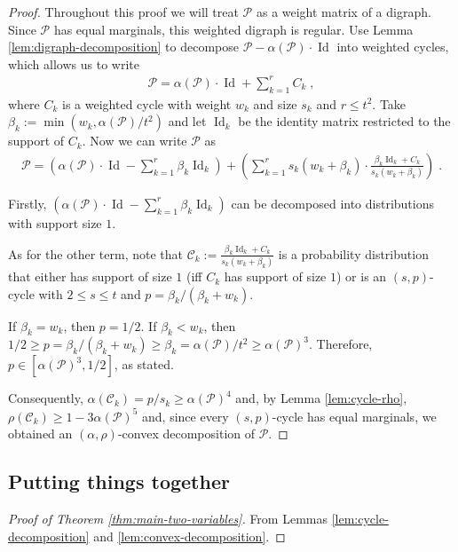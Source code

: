 \documentclass{daj}
\newcommand{\1}{\mathbbm{1}}
\theoremstyle{plain}
\theoremstyle{definition}
\DeclareMathOperator{\Id}{Id}
\newcommand{\cP}{\mathcal{P}}
\begin{document}
\begin{proof}
Throughout this proof we will treat $\mathcal{P}$ as a weight matrix of
a digraph. Since $\cP$ has equal marginals, this weighted digraph is regular.
Use Lemma \ref{lem:digraph-decomposition} to decompose
$\cP - \alpha(\cP) \cdot \Id$ into weighted cycles, which allows us to write
\begin{align*}
	\cP = \alpha(\cP) \cdot \Id + \sum_{k=1}^{r} C_k \; ,
\end{align*}
where $C_k$ is a weighted cycle with weight $w_k$ and size $s_k$
and $r \le t^2$.
Take $\beta_k := \min(w_k, \alpha(\cP) / t^2)$ and let
$\Id_k$ be the identity matrix restricted to the support of $C_k$. Now we
can write $\cP$ as
\begin{align*}
\cP = \left( \alpha(\cP) \cdot \Id - \sum_{k=1}^{r} \beta_k \Id_k \right) + 
	\left( \sum_{k=1}^{r} s_k (w_k + \beta_k) \cdot 
  \frac{\beta_k \Id_k + C_k}{s_k(w_k + \beta_k)} \right) \; .
\end{align*}

Firstly, $\left( \alpha(\cP) \cdot \Id - \sum_{k=1}^{r} \beta_k \Id_k \right)$
can be decomposed into distributions with support size $1$.

As for the other term, note that 
$\mathcal{C}_k := \frac{\beta_k \Id_k + C_k}{s_k(w_k + \beta_k)}$ is a probability
distribution that
either has support of size $1$ (iff $C_k$ has
support of size $1$) or is an $(s, p)$-cycle with 
$2 \le s \le t$ and $p = \beta_k/(\beta_k+w_k)$.

If $\beta_k = w_k$, then $p  = 1/2$. If $\beta_k < w_k$, then
$1/2 \ge p = \beta_k / (\beta_k+w_k) \ge \beta_k = \alpha(\cP) / t^2 \ge 
\alpha(\cP)^3$.
Therefore, $p \in [\alpha(\cP)^3, 1/2]$, as stated.

Consequently, $\alpha(\mathcal{C}_k) = p/s_k \ge \alpha(\cP)^4$
and, by Lemma \ref{lem:cycle-rho}, 
$\rho(\mathcal{C}_k) \ge 1-3\alpha(\cP)^5$ and, since
every $(s,p)$-cycle has equal marginals,
we obtained
an $(\alpha, \rho)$-convex decomposition of $\cP$.
\end{proof}

\subsection{Putting things together}

\begin{proof}[Proof of Theorem \ref{thm:main-two-variables}]
From Lemmas \ref{lem:cycle-decomposition} and
\ref{lem:convex-decomposition}.
\end{proof}
\end{document}
